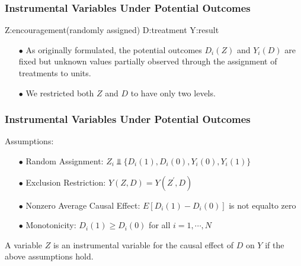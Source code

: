 \documentclass{beamer}
\begin{document}
\begin{frame}
    \frametitle{Instrumental Variables Under Potential Outcomes}
    \begin{flushleft}
        Z:encouragement(randomly assigned) D:treatment Y:result
    \end{flushleft}
    \begin{itemize}
        \item[$\bullet$] As originally formulated, the potential outcomes $D_i(Z)$ and $Y_i(D)$ are fixed but unknown values partially
        observed through the assignment of treatments to units.
        \item[$\bullet$] We restricted both $Z$ and $D$ to have only two levels.
    \end{itemize}
\end{frame}

\begin{frame}
    \frametitle{Instrumental Variables Under Potential Outcomes}
    Assumptions:
    \begin{itemize}
        \item[$\bullet$] Random Assignment: $Z_i\Vbar \{D_i(1),D_i(0),Y_i(0),Y_i(1)\}$ 
        \item[$\bullet$] Exclusion Restriction: $Y(Z,D)=Y(Z^{\prime},D)$
        \item[$\bullet$] Nonzero Average Causal Effect: $E[D_i(1) - D_i(0)] $ is not equalto zero
        \item[$\bullet$] Monotonicity: $D_i(1)\geq D_i(0)$ for all $i=1,\cdots,N$
    \end{itemize}
    A variable $Z$ is an instrumental variable for the causal effect of $D$ on $Y$ if the above assumptions hold.
\end{frame}
\end{document}
